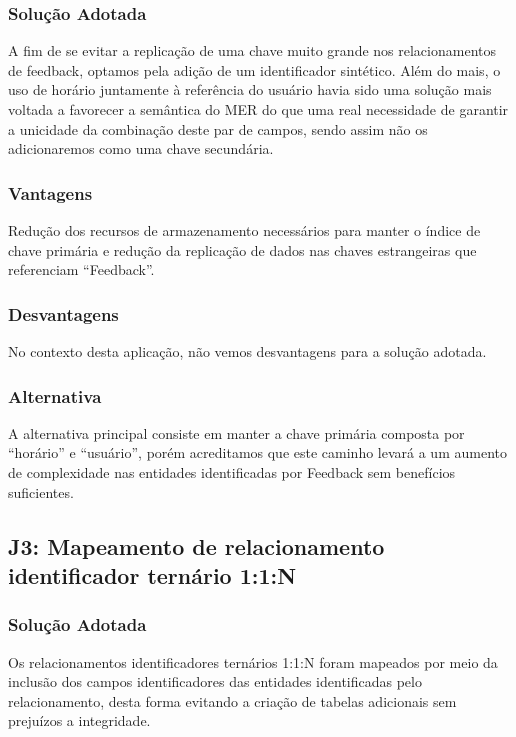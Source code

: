 \subsubsection{Solução Adotada}

A fim de se evitar a replicação de uma chave muito grande nos relacionamentos
de feedback, optamos pela adição de um identificador sintético. Além do mais, o
uso de horário juntamente à referência do usuário havia sido uma solução mais
voltada a favorecer a semântica do MER do que uma real necessidade de garantir
a unicidade da combinação deste par de campos, sendo assim não os adicionaremos
como uma chave secundária.

\subsubsection{Vantagens}

Redução dos recursos de armazenamento necessários para manter o índice de chave
primária e redução da replicação de dados nas chaves estrangeiras que
referenciam ``Feedback''.

\subsubsection{Desvantagens}

No contexto desta aplicação, não vemos desvantagens para a solução adotada.

\subsubsection{Alternativa}

A alternativa principal consiste em manter a chave primária composta por
``horário'' e ``usuário'', porém acreditamos que este caminho levará a um
aumento de complexidade nas entidades identificadas por Feedback sem benefícios
suficientes.

\subsection{\textbf{J3:} Mapeamento de relacionamento identificador ternário 1:1:N}

\subsubsection{Solução Adotada}

Os relacionamentos identificadores ternários 1:1:N foram mapeados por meio da
inclusão dos campos identificadores das entidades identificadas pelo
relacionamento, desta forma evitando a criação de tabelas adicionais sem
prejuízos a integridade.

